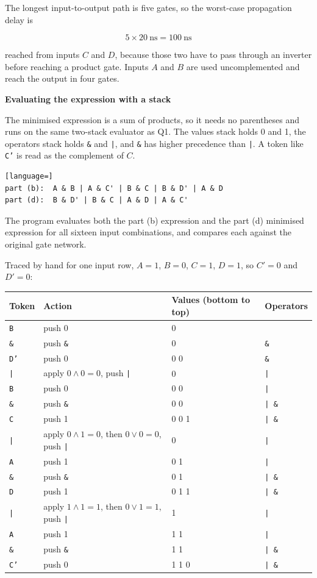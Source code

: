 \documentclass[11pt]{article}
\begin{document}
The longest input-to-output path is five gates, so the worst-case propagation delay is

\[ 5 \times 20\ \text{ns} = 100\ \text{ns} \]

reached from inputs $C$ and $D$, because those two have to pass through an inverter before
reaching a product gate. Inputs $A$ and $B$ are used uncomplemented and reach the output in
four gates.

\newpage
\textbf{Evaluating the expression with a stack}

The minimised expression is a sum of products, so it needs no parentheses and runs on the
same two-stack evaluator as Q1. The values stack holds 0 and 1, the operators stack holds
\texttt{\&} and \texttt{|}, and \texttt{\&} has higher precedence than \texttt{|}. A token
like \texttt{C'} is read as the complement of $C$.

\begin{lstlisting}[language=]
part (b):  A & B | A & C' | B & C | B & D' | A & D
part (d):  B & D' | B & C | A & D | A & C'
\end{lstlisting}

The program evaluates both the part (b) expression and the part (d) minimised expression
for all sixteen input combinations, and compares each against the original gate network.

Traced by hand for one input row, $A=1$, $B=0$, $C=1$, $D=1$, so $C'=0$ and $D'=0$:

\begin{tabular}{llll}
Token & Action & Values (bottom to top) & Operators \\[2pt]
\hline
\texttt{B}  & push 0 & 0 & \\
\texttt{\&} & push \texttt{\&} & 0 & \texttt{\&} \\
\texttt{D'} & push 0 & 0 0 & \texttt{\&} \\
\texttt{|}  & apply $0 \wedge 0 = 0$, push \texttt{|} & 0 & \texttt{|} \\
\texttt{B}  & push 0 & 0 0 & \texttt{|} \\
\texttt{\&} & push \texttt{\&} & 0 0 & \texttt{| \&} \\
\texttt{C}  & push 1 & 0 0 1 & \texttt{| \&} \\
\texttt{|}  & apply $0 \wedge 1 = 0$, then $0 \vee 0 = 0$, push \texttt{|} & 0 & \texttt{|} \\
\texttt{A}  & push 1 & 0 1 & \texttt{|} \\
\texttt{\&} & push \texttt{\&} & 0 1 & \texttt{| \&} \\
\texttt{D}  & push 1 & 0 1 1 & \texttt{| \&} \\
\texttt{|}  & apply $1 \wedge 1 = 1$, then $0 \vee 1 = 1$, push \texttt{|} & 1 & \texttt{|} \\
\texttt{A}  & push 1 & 1 1 & \texttt{|} \\
\texttt{\&} & push \texttt{\&} & 1 1 & \texttt{| \&} \\
\texttt{C'} & push 0 & 1 1 0 & \texttt{| \&} \\
\end{tabular}
\end{document}
